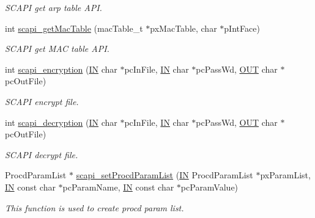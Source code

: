 \begin{DoxyCompactItemize}
\begin{DoxyCompactList}\small\item\em S\-C\-A\-P\-I get arp table A\-P\-I. \end{DoxyCompactList}\item 
int \hyperlink{group__LIBSCAPI_ga90a839943087b6d1cd03f16c38ab97aa}{scapi\-\_\-get\-Mac\-Table} (mac\-Table\-\_\-t $\ast$px\-Mac\-Table, char $\ast$p\-Int\-Face)
\begin{DoxyCompactList}\small\item\em S\-C\-A\-P\-I get M\-A\-C table A\-P\-I. \end{DoxyCompactList}\item 
int \hyperlink{group__LIBSCAPI_ga986c35abd592dd612aeb0afce832a5a6}{scapi\-\_\-encryption} (\hyperlink{group__LIBHELP_gac2bbd6d630a06a980d9a92ddb9a49928}{I\-N} char $\ast$pc\-In\-File, \hyperlink{group__LIBHELP_gac2bbd6d630a06a980d9a92ddb9a49928}{I\-N} char $\ast$pc\-Pass\-Wd, \hyperlink{group__LIBHELP_gaec78e7a9e90a406a56f859ee456e8eae}{O\-U\-T} char $\ast$pc\-Out\-File)
\begin{DoxyCompactList}\small\item\em S\-C\-A\-P\-I encrypt file. \end{DoxyCompactList}\item 
int \hyperlink{group__LIBSCAPI_gaf86de8cb1dc3a743e67a0a8140d6b14b}{scapi\-\_\-decryption} (\hyperlink{group__LIBHELP_gac2bbd6d630a06a980d9a92ddb9a49928}{I\-N} char $\ast$pc\-In\-File, \hyperlink{group__LIBHELP_gac2bbd6d630a06a980d9a92ddb9a49928}{I\-N} char $\ast$pc\-Pass\-Wd, \hyperlink{group__LIBHELP_gaec78e7a9e90a406a56f859ee456e8eae}{O\-U\-T} char $\ast$pc\-Out\-File)
\begin{DoxyCompactList}\small\item\em S\-C\-A\-P\-I decrypt file. \end{DoxyCompactList}\item 
Procd\-Param\-List $\ast$ \hyperlink{group__LIBSCAPI_ga485c4155bc5825315bea2b48e564f209}{scapi\-\_\-set\-Procd\-Param\-List} (\hyperlink{group__LIBHELP_gac2bbd6d630a06a980d9a92ddb9a49928}{I\-N} Procd\-Param\-List $\ast$px\-Param\-List, \hyperlink{group__LIBHELP_gac2bbd6d630a06a980d9a92ddb9a49928}{I\-N} const char $\ast$pc\-Param\-Name, \hyperlink{group__LIBHELP_gac2bbd6d630a06a980d9a92ddb9a49928}{I\-N} const char $\ast$pc\-Param\-Value)
\begin{DoxyCompactList}\small\item\em This function is used to create procd param list. \end{DoxyCompactList}\item 

\end{DoxyCompactItemize}
